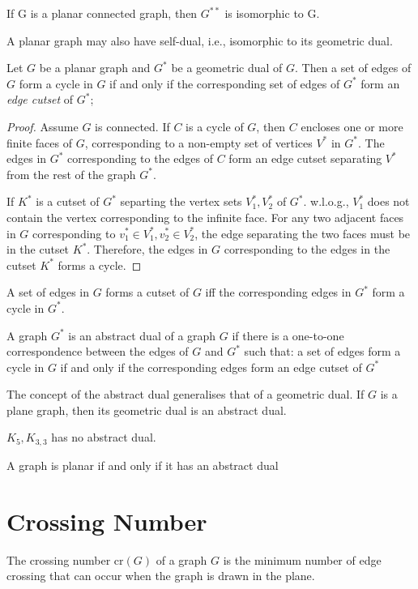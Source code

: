 \begin{theorem}
If G is a planar connected graph, then $G^{**}$ is isomorphic to G.
\end{theorem}
\begin{definition}
A planar graph may also have self-dual, i.e., isomorphic to its geometric dual.
\end{definition}
\begin{theorem}
Let $G$ be a planar graph and $G^*$ be a geometric dual of $G$.
Then a set of edges of $G$ form a cycle in $G$ if and only if the corresponding set of edges of $G^*$ form an \emph{edge cutset} of $G^*$;
\end{theorem}
\begin{proof}
Assume $G$ is connected.
If $C$ is a cycle of $G$, then $C$ encloses one or more finite faces of $G$, corresponding to a non-empty set of vertices $V^*$ in $G^*$. The edges in $G^*$ corresponding to the edges of $C$ form an edge cutset separating $V^*$ from the rest of the graph $G^*$.

If $K^*$ is a cutset of $G^*$ separting the vertex sets $V_1^*,V_2^*$ of $G^*$. 
w.l.o.g., $V_1^*$ does not contain the vertex corresponding to the infinite face. 
For any two adjacent faces in $G$ corresponding to $v_1^*\in V_1^*,v_2^*\in V_2^*$, 
the edge separating the two faces must be in the cutset $K^*$.
Therefore, the edges in $G$ corresponding to the edges in the cutset $K^*$ forms a cycle.
\end{proof}
\begin{corollary}
A set of edges in $G$ forms a cutset of $G$ iff the corresponding edges in $G^*$ form a cycle in $G^*$.
\end{corollary}
\begin{definition}
A graph $G^*$ is an abstract dual of a graph $G$ if there is a one-to-one correspondence between the edges of $G$ and $G^*$ such that:
a set of edges form a cycle in $G$ if and only if the corresponding edges form an edge cutset of $G^*$
\end{definition}
The concept of the abstract dual generalises that of a geometric dual. If $G$ is a plane graph, then its geometric dual is an abstract dual.
\begin{proposition}
$K_5,K_{3,3}$ has no abstract dual.
\end{proposition}
\begin{theorem}
A graph is planar if and only if it has an abstract dual
\end{theorem}

\section{Crossing Number}
\begin{definition}
The crossing number $\text{cr}(G)$ of a graph $G$ is the minimum number of edge crossing that can occur when the graph is drawn in the plane.
\end{definition}

